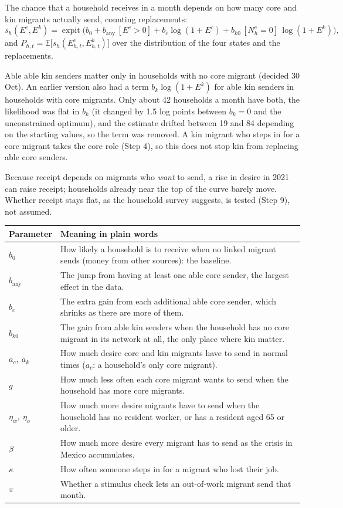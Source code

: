\documentclass[11pt]{article}
\newcommand{\expit}{\operatorname{expit}}
\begin{document}
The chance that a household receives in a month depends on how many core and kin migrants actually send, counting replacements:
\begin{equation}
s_h(E^c, E^k) = \expit\Big(b_0 + b_{\text{any}}\,[E^c > 0] + b_c \log(1 + E^c) + b_{k0}\,[N^c_h = 0]\,\log(1 + E^k)\Big),
\end{equation}
and $P_{h,t} = \mathbb{E}\big[s_h(E^c_{h,t}, E^k_{h,t})\big]$ over the distribution of the four states and the replacements.

Able able kin senders matter only in households with no core migrant (decided 30 Oct). An earlier version also had a term $b_k \log(1 + E^k)$ for able kin senders in households with core migrants. Only about 42 households a month have both, the likelihood was flat in $b_k$ (it changed by 1.5 log points between $b_k = 0$ and the unconstrained optimum), and the estimate drifted between 19 and 84 depending on the starting values, so the term was removed. A kin migrant who steps in for a core migrant takes the core role (Step 4), so this does not stop kin from replacing able core senders.

Because receipt depends on migrants who \emph{want} to send, a rise in desire in 2021 can raise receipt; households already near the top of the curve barely move. Whether receipt stays flat, as the household survey suggests, is tested (Step 9), not assumed.

\begin{center}
\begin{tabularx}{\linewidth}{lX}
\toprule
Parameter & Meaning in plain words \\
\midrule
$b_0$ & How likely a household is to receive when no linked migrant sends (money from other sources): the baseline. \\
$b_{\text{any}}$ & The jump from having at least one able core sender, the largest effect in the data. \\
$b_c$ & The extra gain from each additional able core sender, which shrinks as there are more of them. \\
$b_{k0}$ & The gain from able kin senders when the household has no core migrant in its network at all, the only place where kin matter. \\
$a_c,\ a_k$ & How much desire core and kin migrants have to send in normal times ($a_c$: a household's only core migrant). \\
$g$ & How much less often each core migrant wants to send when the household has more core migrants. \\
$\eta_w,\ \eta_o$ & How much more desire migrants have to send when the household has no resident worker, or has a resident aged 65 or older. \\
$\beta$ & How much more desire every migrant has to send as the crisis in Mexico accumulates. \\
$\kappa$ & How often someone steps in for a migrant who lost their job. \\
$\pi$ & Whether a stimulus check lets an out-of-work migrant send that month. \\
\bottomrule
\end{tabularx}
\end{center}
\end{document}
